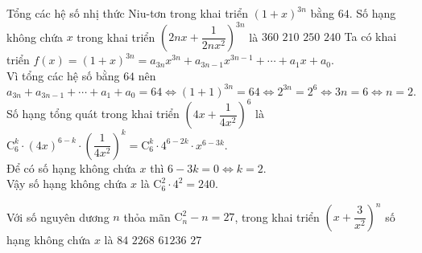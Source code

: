 \begin{ex}%
	Tổng các hệ số nhị thức Niu-tơn trong khai triển $(1+x)^{3n}$ bằng $64$. Số hạng không chứa $x$ trong khai triển $\left(2nx+\dfrac{1}{2nx^2}\right)^{3n}$ là
	\choice
	{$360$}
	{$210$}
	{$250$}
	{\True $240$}
	\loigiai
	{Ta có khai triển $f(x)=(1+x)^{3n}=a_{3n}x^{3n}+a_{3n-1}x^{3n-1}+\cdots +a_1x+a_0$.\\
	Vì tổng các hệ số bằng $64$ nên $$a_{3n}+a_{3n-1}+\cdots +a_1+a_0=64\Leftrightarrow (1+1)^{3n}=64\Leftrightarrow 2^{3n}=2^6\Leftrightarrow 3n=6\Leftrightarrow n=2.$$
	Số hạng tổng quát trong khai triển $\left(4x+\dfrac{1}{4x^2}\right)^6$ là $\mathrm{C}_6^k\cdot (4x)^{6-k}\cdot \left(\dfrac{1}{4x^2}\right)^k=\mathrm{C}_6^k\cdot 4^{6-2k}\cdot x^{6-3k}$.\\
	Để có số hạng không chứa $x$ thì $6-3k=0\Leftrightarrow k=2$.\\
	Vậy số hạng không chứa $x$ là $\mathrm{C}_6^2\cdot 4^2=240$.	
	}
\end{ex}%
\begin{ex}%
	Với số nguyên dương $n$ thỏa mãn $\mathrm{C}_n^2-n=27$, trong khai triển $\left(x+\dfrac{3}{x^2}\right)^n$ số hạng không chứa $x$ là 
	\choice
	{$84$}
	{\True $2268$}
	{$61236$}
	{$27$}
\end{ex}%
